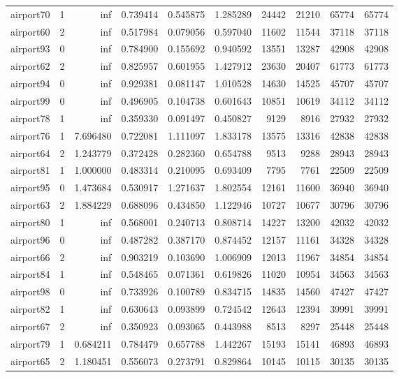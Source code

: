 \begin{longtable}{|l|r|r|r|r|r|r|r|r|r|}
airport70 & 1 & inf & 0.739414 & 0.545875 & 1.285289 & 24442 & 21210 & 65774 & 65774 \\
airport60 & 2 & inf & 0.517984 & 0.079056 & 0.597040 & 11602 & 11544 & 37118 & 37118 \\
airport93 & 0 & inf & 0.784900 & 0.155692 & 0.940592 & 13551 & 13287 & 42908 & 42908 \\
airport62 & 2 & inf & 0.825957 & 0.601955 & 1.427912 & 23630 & 20407 & 61773 & 61773 \\
airport94 & 0 & inf & 0.929381 & 0.081147 & 1.010528 & 14630 & 14525 & 45707 & 45707 \\
airport99 & 0 & inf & 0.496905 & 0.104738 & 0.601643 & 10851 & 10619 & 34112 & 34112 \\
airport78 & 1 & inf & 0.359330 & 0.091497 & 0.450827 & 9129 & 8916 & 27932 & 27932 \\
airport76 & 1 & 7.696480 & 0.722081 & 1.111097 & 1.833178 & 13575 & 13316 & 42838 & 42838 \\
airport64 & 2 & 1.243779 & 0.372428 & 0.282360 & 0.654788 & 9513 & 9288 & 28943 & 28943 \\
airport81 & 1 & 1.000000 & 0.483314 & 0.210095 & 0.693409 & 7795 & 7761 & 22509 & 22509 \\
airport95 & 0 & 1.473684 & 0.530917 & 1.271637 & 1.802554 & 12161 & 11600 & 36940 & 36940 \\
airport63 & 2 & 1.884229 & 0.688096 & 0.434850 & 1.122946 & 10727 & 10677 & 30796 & 30796 \\
airport80 & 1 & inf & 0.568001 & 0.240713 & 0.808714 & 14227 & 13200 & 42032 & 42032 \\
airport96 & 0 & inf & 0.487282 & 0.387170 & 0.874452 & 12157 & 11161 & 34328 & 34328 \\
airport66 & 2 & inf & 0.903219 & 0.103690 & 1.006909 & 12013 & 11967 & 34854 & 34854 \\
airport84 & 1 & inf & 0.548465 & 0.071361 & 0.619826 & 11020 & 10954 & 34563 & 34563 \\
airport98 & 0 & inf & 0.733926 & 0.100789 & 0.834715 & 14835 & 14560 & 47427 & 47427 \\
airport82 & 1 & inf & 0.630643 & 0.093899 & 0.724542 & 12643 & 12394 & 39991 & 39991 \\
airport67 & 2 & inf & 0.350923 & 0.093065 & 0.443988 & 8513 & 8297 & 25448 & 25448 \\
airport79 & 1 & 0.684211 & 0.784479 & 0.657788 & 1.442267 & 15193 & 15141 & 46893 & 46893 \\
airport65 & 2 & 1.180451 & 0.556073 & 0.273791 & 0.829864 & 10145 & 10115 & 30135 & 30135 \\

\end{longtable}
